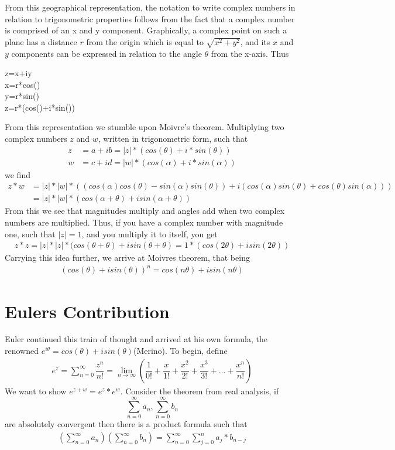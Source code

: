 \documentclass[12pt]{article}
\begin{document}
From this geographical representation, the notation to write complex numbers in relation to trigonometric properties follows from the fact that a complex number is comprised of an x and y component. Graphically, a complex point on such a plane has a distance $r$ from the origin which is equal to $\sqrt{x^2+y^2}$, and its $x$ and $y$ components can be expressed in relation to the angle $\theta$ from the x-axis. Thus
\begin{center}
z=x+iy\\
x=r*cos(\theta)\\
y=r*sin(\theta)\\
\therefore z=r*(cos(\theta)+i*sin(\theta))\\
\end{center}
From this representation we stumble upon Moivre’s theorem. Multiplying two complex numbers $z$ and $w$, written in trigonometric form, such that
\begin{align*}
z&=a+ib=|z|*(cos(\theta)+i*sin(\theta))\\
w&=c+id=|w|*(cos(\alpha)+i*sin(\alpha))
\end{align*}
we find
\begin{align*}
z*w&=|z|*|w|*((cos(\alpha)cos(\theta)-sin(\alpha)sin(\theta))+i(cos(\alpha)sin(\theta)+cos(\theta)sin(\alpha)))\\
&=|z|*|w|*(cos(\alpha+\theta)+isin(\alpha+\theta))
\end{align*}
From this we see that magnitudes multiply and angles add when two complex numbers are multiplied. Thus, if you have a complex number with magnitude one, such that $|z|=1$, and you multiply it to itself, you get
\begin{align*}
z*z=|z|*|z|*(cos(\theta+\theta)+isin(\theta+\theta)=1*(cos(2\theta)+isin(2\theta))
\end{align*}
Carrying this idea further, we arrive at Moivres theorem, that being
\begin{align*}
(cos(\theta)+isin(\theta))^n=cos(n\theta)+isin(n\theta)
\end{align*}

\section{Eulers Contribution}
Euler continued this train of thought and arrived at his own formula, the renowned $e^{i\theta}=cos(\theta)+isin(\theta)$(Merino).
To begin, define
\begin{align*}
e^z=\sum_{n=0}^{\infty} \dfrac{z^n}{n!}=\lim_{n\to\infty}(\dfrac{1}{0!}+\dfrac{x}{1!}+\dfrac{x^2}{2!}+\dfrac{x^3}{3!}+...+\dfrac{x^n}{n!})
\end{align*} 
We want to show $e^{z+w}=e^z*e^w$. Consider the theorem from real analysis, if $$\sum_{n=0}^{\infty}a_n, \sum_{n=0}^{\infty}b_n$$ are absolutely convergent then there is a product formula such that
\begin{align*}
(\sum_{n=0}^{\infty}a_n)(\sum_{n=0}^{\infty}b_n)=\sum_{n=0}^{\infty}\sum_{j=0}^{n}a_j*b_{n-j}
\end{align*}
\end{document}
